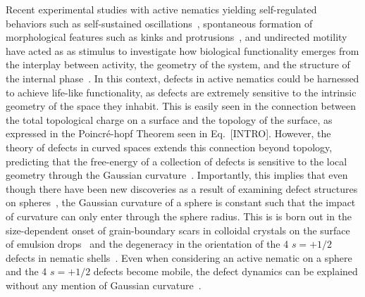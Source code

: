 Recent experimental studies with active nematics yielding self-regulated behaviors such as self-sustained oscillations~\cite{RN9}, spontaneous formation of morphological features such as kinks and protrusions~\cite{RN9,RN3}, and undirected motility~\cite{RN9,RN3} have acted as as stimulus to investigate how biological functionality emerges from the interplay between activity, the geometry of the system, and the structure of the internal phase~\cite{RN160,RN51,RN10}.
In this context, defects in active nematics could be harnessed to achieve life-like functionality, as defects are extremely sensitive to the intrinsic geometry of the space they inhabit.
This is easily seen in the connection between the total topological charge on a surface and the topology of the surface, as expressed in the Poincr\'e-hopf Theorem seen in Eq.~[INTRO].
However, the theory of defects in curved spaces extends this connection beyond topology, predicting that the free-energy of a collection of defects is sensitive to the local geometry through the Gaussian curvature~\cite{RN42}.
Importantly, this implies that even though there have been new discoveries as a result of examining defect structures on spheres~\cite{RN45,RN106,RN26,RN110,RN105,RN76,RN101,RN165}, the Gaussian curvature of a sphere is constant such that the impact of curvature can only enter through the sphere radius.
This is is born out in the size-dependent onset of grain-boundary scars in colloidal crystals on the surface of emulsion drops~\cite{RN26,RN110} and the degeneracy in the orientation of the 4 $s = +1/2$ defects in nematic shells~\cite{RN45}.
Even when considering an active nematic on a sphere and the 4 $s = +1/2$ defects become mobile, the defect dynamics can be explained without any mention of Gaussian curvature~\cite{RN9}. \\

